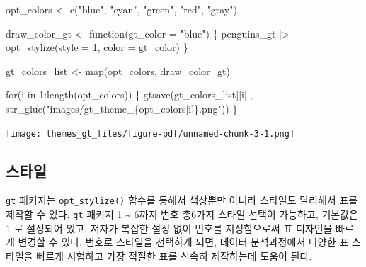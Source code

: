 \documentclass[
  letterpaper,
]{book}
\newenvironment{Shaded}{\begin{snugshade}}{\end{snugshade}}
\newcommand{\AttributeTok}[1]{\textcolor[rgb]{0.40,0.45,0.13}{#1}}
\newcommand{\ControlFlowTok}[1]{\textcolor[rgb]{0.00,0.23,0.31}{#1}}
\newcommand{\DecValTok}[1]{\textcolor[rgb]{0.68,0.00,0.00}{#1}}
\newcommand{\FunctionTok}[1]{\textcolor[rgb]{0.28,0.35,0.67}{#1}}
\newcommand{\NormalTok}[1]{\textcolor[rgb]{0.00,0.23,0.31}{#1}}
\newcommand{\OtherTok}[1]{\textcolor[rgb]{0.00,0.23,0.31}{#1}}
\newcommand{\SpecialCharTok}[1]{\textcolor[rgb]{0.37,0.37,0.37}{#1}}
\newcommand{\StringTok}[1]{\textcolor[rgb]{0.13,0.47,0.30}{#1}}
\begin{document}
\begin{Shaded}
\begin{Highlighting}[]
\NormalTok{opt\_colors }\OtherTok{\textless{}{-}} \FunctionTok{c}\NormalTok{(}\StringTok{"blue"}\NormalTok{, }\StringTok{"cyan"}\NormalTok{, }\StringTok{"green"}\NormalTok{, }\StringTok{"red"}\NormalTok{, }\StringTok{"gray"}\NormalTok{)}

\NormalTok{draw\_color\_gt }\OtherTok{\textless{}{-}} \ControlFlowTok{function}\NormalTok{(}\AttributeTok{gt\_color =} \StringTok{"blue"}\NormalTok{) \{}
\NormalTok{  penguins\_gt }\SpecialCharTok{|\textgreater{}} 
    \FunctionTok{opt\_stylize}\NormalTok{(}\AttributeTok{style =} \DecValTok{1}\NormalTok{, }\AttributeTok{color =}\NormalTok{ gt\_color)}
\NormalTok{\}                }

\NormalTok{gt\_colors\_list }\OtherTok{\textless{}{-}} \FunctionTok{map}\NormalTok{(opt\_colors, draw\_color\_gt)}


\ControlFlowTok{for}\NormalTok{(i }\ControlFlowTok{in} \DecValTok{1}\SpecialCharTok{:}\FunctionTok{length}\NormalTok{(opt\_colors)) \{}
  \FunctionTok{gtsave}\NormalTok{(gt\_colors\_list[[i]], }\FunctionTok{str\_glue}\NormalTok{(}\StringTok{"images/gt\_theme\_\{opt\_colors[i]\}.png"}\NormalTok{))}
\NormalTok{\}}
\end{Highlighting}
\end{Shaded}

\texttt{[image: themes\_gt\_files/figure-pdf/unnamed-chunk-3-1.png]}

\hypertarget{uxc2a4uxd0c0uxc77c}{%
\subsection{스타일}\label{uxc2a4uxd0c0uxc77c}}

\texttt{gt} 패키지는 \texttt{opt\_stylize()} 함수를 통해서 색상뿐만
아니라 스타일도 달리해서 표를 제작할 수 있다. \texttt{gt} 패키지 1
\textasciitilde{} 6까지 번호 총6가지 스타일 선택이 가능하고, 기본값은 1
로 설정되어 있고, 저자가 복잡한 설정 없이 번호를 지정함으로써 표
디자인을 빠르게 변경할 수 있다. 번호로 스타일을 선택하게 되면, 데이터
분석과정에서 다양한 표 스타일을 빠르게 시험하고 가장 적절한 표를 신속히
제작하는데 도움이 된다.
\end{document}
